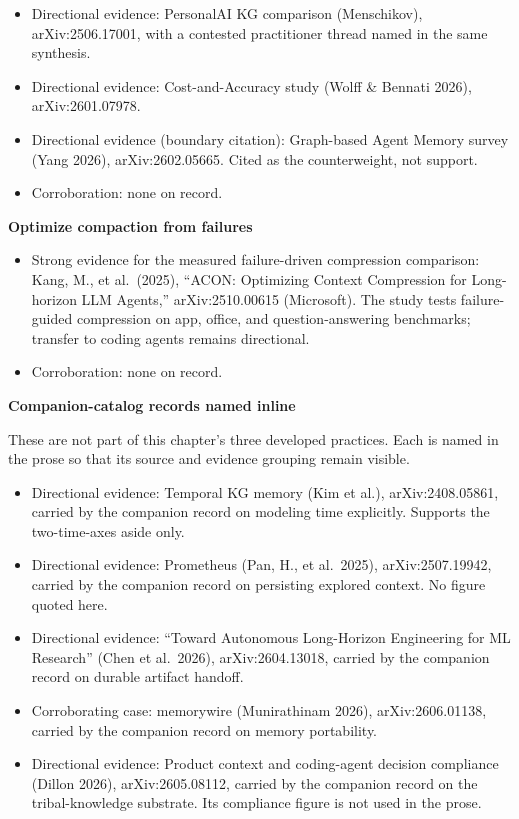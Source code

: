 \begin{itemize}
\tightlist
\item
  Directional evidence: PersonalAI KG comparison (Menschikov), arXiv:2506.17001, with a contested practitioner thread named in the same synthesis.
\item
  Directional evidence: Cost-and-Accuracy study (Wolff \& Bennati 2026), arXiv:2601.07978.
\item
  Directional evidence (boundary citation): Graph-based Agent Memory survey (Yang 2026), arXiv:2602.05665. Cited as the counterweight, not support.
\item
  Corroboration: none on record.
\end{itemize}

\textbf{Optimize compaction from failures}

\begin{itemize}
\tightlist
\item
  Strong evidence for the measured failure-driven compression comparison: Kang, M., et al.~(2025), ``ACON: Optimizing Context Compression for Long-horizon LLM Agents,'' arXiv:2510.00615 (Microsoft). The study tests failure-guided compression on app, office, and question-answering benchmarks; transfer to coding agents remains directional.
\item
  Corroboration: none on record.
\end{itemize}

\textbf{Companion-catalog records named inline}

These are not part of this chapter's three developed practices. Each is named in the prose so that its source and evidence grouping remain visible.

\begin{itemize}
\tightlist
\item
  Directional evidence: Temporal KG memory (Kim et al.), arXiv:2408.05861, carried by the companion record on modeling time explicitly. Supports the two-time-axes aside only.
\item
  Directional evidence: Prometheus (Pan, H., et al.~2025), arXiv:2507.19942, carried by the companion record on persisting explored context. No figure quoted here.
\item
  Directional evidence: ``Toward Autonomous Long-Horizon Engineering for ML Research'' (Chen et al.~2026), arXiv:2604.13018, carried by the companion record on durable artifact handoff.
\item
  Corroborating case: memorywire (Munirathinam 2026), arXiv:2606.01138, carried by the companion record on memory portability.
\item
  Directional evidence: Product context and coding-agent decision compliance (Dillon 2026), arXiv:2605.08112, carried by the companion record on the tribal-knowledge substrate. Its compliance figure is not used in the prose.
\end{itemize}
